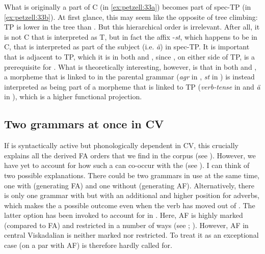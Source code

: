 \documentclass[output=paper,colorlinks,citecolor=brown,draft,draftmode]{langscibook}
\begin{document}
What is originally a part of C (in \ref{ex:petzell:33a}) becomes part of spec-TP (in \ref{ex:petzell:33b}). At first glance, this may seem like the opposite of tree climbing: TP is lower in the tree than . But this hierarchical order is irrelevant. After all, it is not C that is interpreted as T, but in fact the  affix -\textit{st}, which happens to be in C, that is interpreted as part of the subject (i.e. \textit{ä}) in spec-TP. It is important that  is adjacent to TP, which it is in both  and , since , on either side of TP, is a prerequisite for . What is theoretically interesting, however, is that in both  and , a morpheme that is linked to  in the parental grammar (\textit{agr} in , \textit{st} in ) is instead interpreted as being part of a morpheme that is linked to TP (\textit{verb-tense} in  and \textit{ä} in ), which is a higher functional projection.


\subsection{Two grammars at once in CV}\label{sec:petzell:5.3}


If  is syntactically active but phonologically dependent in CV, this crucially explains all the  derived FA orders that we find in the corpus (see ). However, we have yet to account for how such a  can co-occur with the  (see ). I can think of two possible explanations. There could be two grammars in use at the same time, one with  (generating FA) and one without  (generating AF). Alternatively, there is only one grammar with  but with an additional and higher position for adverbs, which makes the  a possible outcome even when the verb has moved out of . The latter option has been invoked to account for  in . Here, AF is highly marked (compared to FA) and restricted in a number of ways (see \citealt{BobaljikThrainsson1998}; \citealt{Thrainsson2007,Thrainsson2010}). However, AF in central Viskadalian is neither marked nor restricted. To treat it as an exceptional case (on a par with  AF) is therefore hardly called for.
\end{document}
